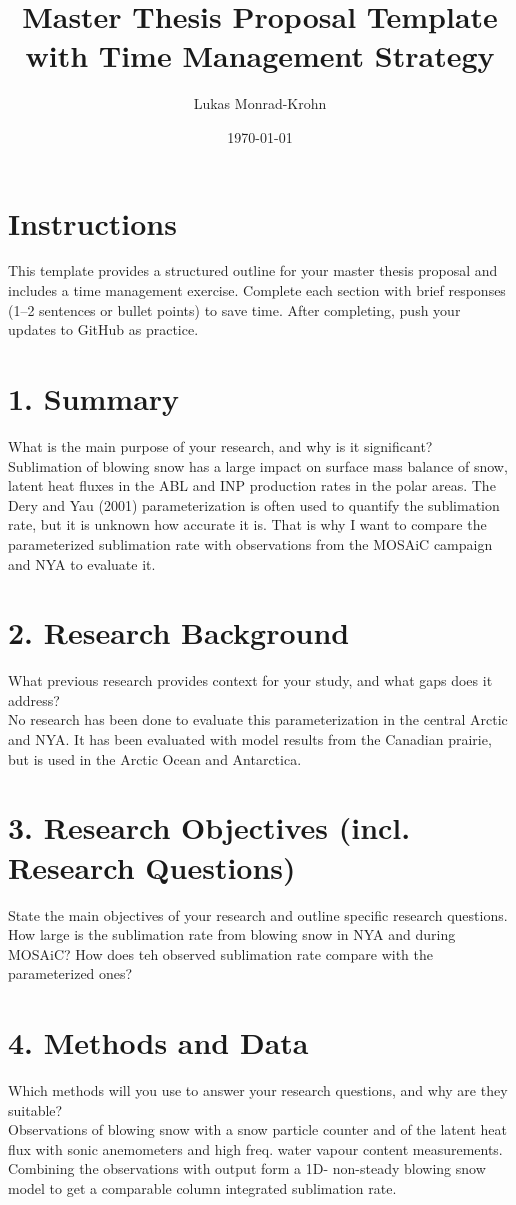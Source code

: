 \documentclass[a4paper,12pt]{article}
\title{Master Thesis Proposal Template with Time Management Strategy}
\author{Lukas Monrad-Krohn}
\date{\today}
\begin{document}
\maketitle

\section*{Instructions}
This template provides a structured outline for your master thesis proposal and includes a time management exercise. Complete each section with brief responses (1–2 sentences or bullet points) to save time. After completing, push your updates to GitHub as practice.

\section{1. Summary}
What is the main purpose of your research, and why is it significant?\\
Sublimation of blowing snow has a large impact on surface mass balance of snow, latent heat fluxes in the ABL and INP production rates in the polar areas. The Dery and Yau (2001) parameterization is often used to quantify the sublimation rate, but it is unknown how accurate it is. That is why I want to compare the parameterized sublimation rate with observations from the MOSAiC campaign and NYA to evaluate it.

\section{2. Research Background}
What previous research provides context for your study, and what gaps does it address?\\
No research has been done to evaluate this parameterization in the central Arctic and NYA. It has been evaluated with model results from the Canadian prairie, but is used in the Arctic Ocean and Antarctica.

\section{3. Research Objectives (incl. Research Questions)}
State the main objectives of your research and outline specific research questions.
How large is the sublimation rate from blowing snow in NYA and during MOSAiC? How does teh observed sublimation rate compare with the parameterized ones?

\section{4. Methods and Data}
Which methods will you use to answer your research questions, and why are they suitable?\\
Observations of blowing snow with a snow particle counter and of the latent heat flux with sonic anemometers and high freq. water vapour content measurements. Combining the observations with output form a 1D- non-steady blowing snow model to get a comparable column integrated sublimation rate. 
\end{document}
